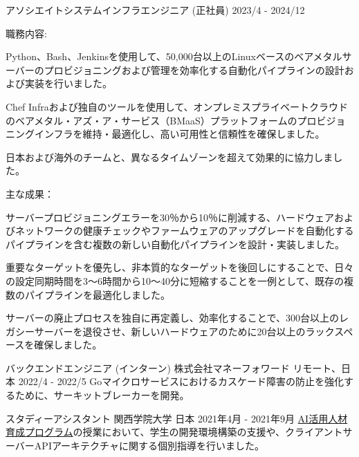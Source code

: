 \begin{cventries}
  \cventry
    {アソシエイトシステムインフラエンジニア (正社員)} %
    {} %
    {} %
    {2023/4 - 2024/12} %
    {
        職務内容:
        \begin{cvbullets}
        \item Python、Bash、Jenkinsを使用して、50,000台以上のLinuxベースのベアメタルサーバーのプロビジョニングおよび管理を効率化する自動化パイプラインの設計および実装を行いました。
        \item Chef Infraおよび独自のツールを使用して、オンプレミスプライベートクラウドのベアメタル・アズ・ア・サービス（BMaaS）プラットフォームのプロビジョニングインフラを維持・最適化し、高い可用性と信頼性を確保しました。
        \item 日本および海外のチームと、異なるタイムゾーンを超えて効果的に協力しました。
        \end{cvbullets}
        主な成果：
        \begin{cvbullets}
        \item サーバープロビジョニングエラーを30％から10％に削減する、ハードウェアおよびネットワークの健康チェックやファームウェアのアップグレードを自動化するパイプラインを含む複数の新しい自動化パイプラインを設計・実装しました。
        \item 重要なターゲットを優先し、非本質的なターゲットを後回しにすることで、日々の設定同期時間を3～6時間から10～40分に短縮することを一例として、既存の複数のパイプラインを最適化しました。
        \item サーバーの廃止プロセスを独自に再定義し、効率化することで、300台以上のレガシーサーバーを退役させ、新しいハードウェアのために20台以上のラックスペースを確保しました。
        \end{cvbullets}
    }

  \cventry
    {バックエンドエンジニア (インターン)} %
    {株式会社マネーフォワード} %
    {リモート、日本} %
    {2022/4 - 2022/5} %
    {
        Goマイクロサービスにおけるカスケード障害の防止を強化するために、サーキットブレーカーを開発。
    }

  \cventry
    {スタディーアシスタント} %
    {関西学院大学} %
    {日本} %
    {2021年4月 - 2021年9月} %
    {
      \href{https://www.kwansei.ac.jp/education/ai}{AI活用人材育成プログラム}の授業において、学生の開発環境構築の支援や、クライアントサーバーAPIアーキテクチャに関する個別指導を行いました。
    }


\end{cventries}
